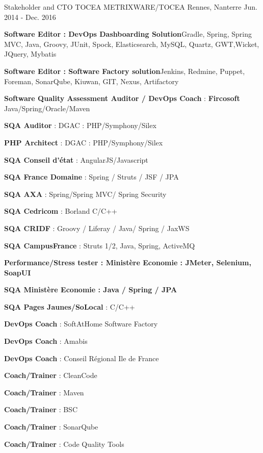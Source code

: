 \begin{cventries}
\cventry
{Stakeholder and CTO TOCEA} %
{METRIXWARE/TOCEA} %
{Rennes, Nanterre} %
{Jun. 2014 - Dec. 2016} %
{
	\begin{cvitems}
\item {\textbf{Software Editor : DevOps Dashboarding Solution}\newline Gradle, Spring, Spring MVC, Java, Groovy, JUnit, Spock, Elasticsearch, MySQL, Quartz, GWT,Wicket, JQuery, Mybatis}
\item {\textbf{Software Editor : Software Factory solution}\newline Jenkins, Redmine, Puppet, Foreman, SonarQube, Kiuwan, GIT, Nexus, Artifactory}
\item {\textbf{Software Quality Assessment Auditor / DevOps Coach} : \textbf{Fircosoft} Java/Spring/Oracle/Maven}
\item {\textbf{SQA Auditor} : DGAC : PHP/Symphony/Silex}                 
\item {\textbf{PHP Architect} : DGAC : PHP/Symphony/Silex}                 
\item {\textbf{SQA Conseil d'état} : AngularJS/Javascript}          
\item {\textbf{SQA France Domaine} : Spring / Struts / JSF / JPA}          	
\item {\textbf{SQA AXA} : Spring/Spring MVC/ Spring Security}
\item {\textbf{SQA Cedricom} : Borland C/C++}	
\item {\textbf{SQA CRIDF} : Groovy / Liferay / Java/ Spring / JaxWS}
\item {\textbf{SQA CampusFrance} : Struts 1/2, Java, Spring, ActiveMQ}	
\item {\textbf{Performance/Stress tester : Ministère Economie : JMeter, Selenium, SoapUI}}
\item {\textbf{SQA Ministère Economie : Java / Spring / JPA}}
\item {\textbf{SQA Pages Jaunes/SoLocal} : C/C++}
\item {\textbf{DevOps Coach} : SoftAtHome Software Factory}
\item {\textbf{DevOps Coach} : Amabis}		 	
\item {\textbf{DevOps Coach} : Conseil Régional Ile de France}	
\item {\textbf{Coach/Trainer} : CleanCode}			 
\item {\textbf{Coach/Trainer} : Maven}
\item {\textbf{Coach/Trainer} : BSC}						
\item {\textbf{Coach/Trainer} : SonarQube}	
\item {\textbf{Coach/Trainer} : Code Quality Tools}	
	\end{cvitems}
}


\end{cventries}

